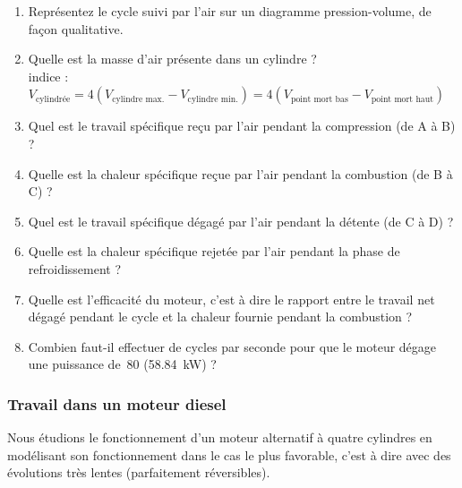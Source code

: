 	\begin{enumerate}
		\item Représentez le cycle suivi par l’air sur un diagramme pression-volume, de façon qualitative.
		\item {Quelle est la masse d’air présente dans un cylindre ?\\
				{\tiny indice : $V_\text{cylindrée} = 4 (V_\text{cylindre max.} - V_\text{cylindre min.}) = 4 (V_\text{point mort bas} - V_\text{point mort haut})$}}
		\item Quel est le travail spécifique reçu par l’air pendant la compression (de A à B) ?
		\item Quelle est la chaleur spécifique reçue par l’air pendant la combustion (de B à C) ?
		\item Quel est le travail spécifique dégagé par l’air pendant la détente (de C à D) ?
		\item Quelle est la chaleur spécifique rejetée par l’air pendant la phase de refroidissement ?
		\item Quelle est l’efficacité du moteur, c’est à dire le rapport entre le travail net dégagé pendant le cycle et la chaleur fournie pendant la combustion ?
		\item Combien faut-il effectuer de cycles par seconde pour que le moteur dégage une puissance de~\SI{80}{\cheval} (\SI{58,84}{\kilo\watt}) ?
	\end{enumerate}



\subsubsection{Travail dans un moteur diesel}
\label{exo_quatre_cylindres}
	
	Nous étudions le fonctionnement d’un moteur alternatif à quatre cylindres en modélisant son fonctionnement dans le cas le plus favorable, c’est à dire avec des évolutions très lentes (parfaitement réversibles).

